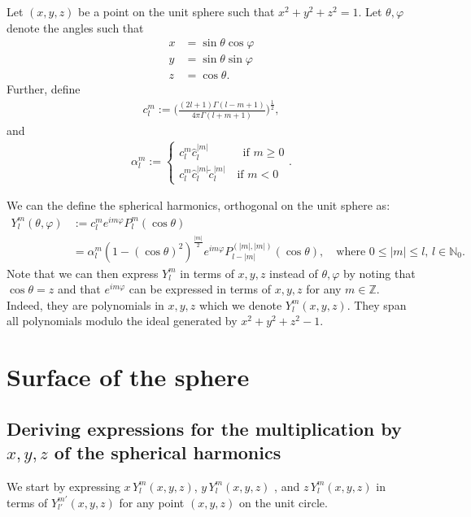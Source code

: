 \documentclass[11pt, oneside]{article}   	%
\newcommand{\No}{\mathbb{N}_0}
\newcommand{\Ylm}{Y^m_l}
\newcommand{\Ylmfull}{Y^m_l(\theta,\varphi)}
\newcommand{\Plm}{P^m_l}
\newcommand{\costheta}{\cos\theta}
\newcommand{\sintheta}{\sin\theta}
\newcommand{\cosphi}{\cos\varphi}
\newcommand{\sinphi}{\sin\varphi}
\newcommand{\eimphi}{e^{im\varphi}}
\newcommand{\alphalm}{\alpha^m_l}
\newcommand{\clm}{c^m_l}
\newcommand{\ctildemod}{\tilde{c}^{|m|}_l}
\newcommand{\chatmod}{\hat{c}^{|m|}_l}
\begin{document}
Let \((x,y,z)\) be a point on the unit sphere such that \(x^2+y^2+z^2 = 1\). Let \(\theta, \varphi\) denote the angles such that
\begin{align}
x &= \sintheta \cosphi \\
y &= \sintheta \sinphi \\
z &= \costheta.
\end{align}
Further, define
\begin{align}
\clm := \Bigg(\frac{(2l+1)\Gamma(l-m+1)}{4\pi\Gamma(l+m+1)}\Bigg)^\frac{1}{2},
\end{align}
and
\begin{align}
\alphalm := \begin{cases} 
		\clm \chatmod \quad \quad \quad \text{if } m \ge 0 \\
		\clm \chatmod \ctildemod \quad \text{if } m < 0
	   \end{cases}.
\end{align}

We can the define the spherical harmonics, orthogonal on the unit sphere as:
\begin{align}
\Ylmfull &:= \clm \eimphi \Plm (\costheta) \\
&= \alphalm (1 - (\costheta)^2)^\frac{|m|}{2} \eimphi P^{(|m|,|m|)}_{l-|m|}(\costheta), \quad \text{where } 0 \le |m| \le l, \, l \in \No.
\end{align} 
Note that we can then express \(\Ylm\) in terms of \(x,y,z\) instead of \(\theta, \varphi\) by noting that \(\costheta = z\) and that \( \eimphi\) can be expressed in terms of \(x,y,z\) for any \(m\in\mathbb{Z}\). Indeed, they are polynomials in $x,y,z$ which we denote $\Ylm(x,y,z)$. They span all polynomials modulo the ideal generated by $x^2 + y^2 + z^2 - 1$.



\section{Surface of the sphere}

\subsection{Deriving expressions for the multiplication by \(x, y, z\) of the spherical harmonics}

We start by expressing \(x\,\Ylm(x,y,z)\), \(y\,\Ylm(x,y,z)\) , and \(z\,\Ylm(x,y,z)\)  in terms of \(Y^{m'}_{l'}(x,y,z)\) for any point \((x,y,z)\) on the unit circle.
\end{document}
